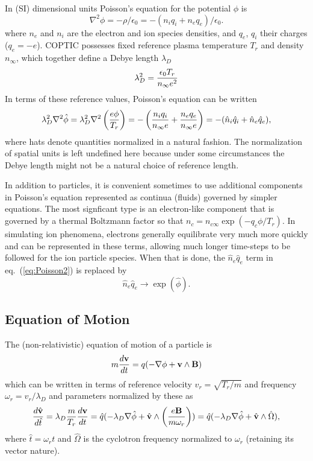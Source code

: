 \documentclass[12pt]{article}
\def\v{{\bf v}}
\def\B{{\bf B}}
\begin{document}
In (SI) dimensional units Poisson's equation for the potential $\phi$ is
\begin{equation}
  \label{eq:PoissonDim}
  \nabla^2 \phi = -\rho/\epsilon_0 = -(n_iq_i+n_eq_e)/\epsilon_0.
\end{equation}
where $n_e$ and $n_i$ are the electron and ion species densities, and
$q_e$, $q_i$ their charges ($q_e=-e$). COPTIC possesses fixed reference
plasma temperature $T_r$ and density $n_\infty$, which together
define a Debye length $\lambda_D$
\begin{equation}
  \label{eq:Debyelen}
  \lambda_D^2= {\epsilon_0T_r\over n_\infty e^2}
\end{equation}
In terms of these reference values, Poisson's equation can be written
\begin{equation}
  \label{eq:Poisson2}
  \lambda_D^2\nabla^2\hat\phi=
  \lambda_D^2\nabla^2\left(e\phi\over T_r\right) =-\left({n_iq_i\over n_\infty e}
    +{n_eq_e\over n_\infty e}\right)=-(\hat n_i\hat q_i+\hat n_e\hat q_e),
\end{equation}
where hats denote quantities normalized in a natural fashion. The
normalization of spatial units is left undefined here because under
some circumstances the Debye length might not be a natural choice of
reference length.

In addition to particles, it is convenient sometimes to use additional
components in Poisson's equation represented as continua (fluids)
governed by simpler equations. The most signficant type is an
electron-like component that is governed by a thermal Boltzmann factor so that
$n_c=n_{c\infty}\exp(-q_c\phi/T_r)$. In simulating ion phenomena,
electrons generally equilibrate very much more quickly and can be
represented in these terms, allowing much longer time-steps to be
followed for the ion particle species. When that is done, the
$\hat n_e\hat q_e$ term in eq.\ (\ref{eq:Poisson2}) is replaced by
\begin{equation}
  \label{eq:Boltzmann}
  \hat n_e\hat q_e \longrightarrow \exp(\hat\phi).
\end{equation}

\subsection{Equation of Motion}

The (non-relativistic) equation of motion of a particle is 
\begin{equation}
  \label{eq:EqofM}
  m {d\v\over dt} = q (-\nabla \phi +\v\wedge\B) 
\end{equation}
which can be written in terms of reference velocity
$v_r=\sqrt{T_r/m}$ and frequency $\omega_r=v_r/\lambda_D$ and
parameters normalized by these as
\begin{equation}
  \label{eq:EofMNorm}
    {d\hat{\v}\over d\hat{t}}=
    \lambda_D{m\over T_r}{d\v\over dt}
=\hat q(-\lambda_D\nabla\hat\phi
+\hat\v\wedge\left(e\B\over m\omega_r\right)) 
=\hat q(-\lambda_D\nabla\hat\phi
+\hat\v\wedge\hat\Omega) ,
\end{equation}
where $\hat t=\omega_r t$ and $\hat\Omega$ is the cyclotron frequency
normalized to $\omega_r$ (retaining its vector nature).
\end{document}
